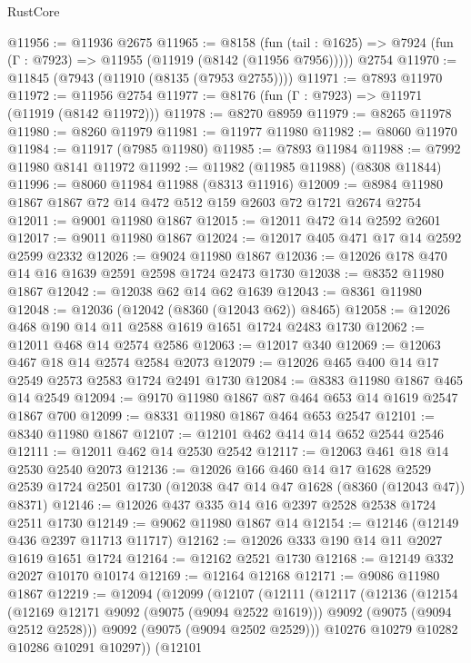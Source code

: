 \begin{lexlean}{RustCore}
\begin{coremodule}
@11956 := @11936 @2675
@11965 := @8158
    (fun (tail : @1625) => @7924 (fun (Γ : @7923) => @11955 (@11919 (@8142 (@11956 @7956)))))
    @2754
@11970 := @11845 (@7943 (@11910 (@8135 (@7953 @2755))))
@11971 := @7893 @11970
@11972 := @11956 @2754
@11977 := @8176 (fun (Γ : @7923) => @11971 (@11919 (@8142 @11972)))
@11978 := @8270 @8959
@11979 := @8265 @11978
@11980 := @8260 @11979
@11981 := @11977 @11980
@11982 := @8060 @11970
@11984 := @11917 (@7985 @11980)
@11985 := @7893 @11984
@11988 := @7992 @11980 @8141 @11972
@11992 := @11982 (@11985 @11988) (@8308 @11844)
@11996 := @8060 @11984 @11988 (@8313 @11916)
@12009 := @8984 @11980 @1867 @1867 @72 @14 @472 @512 @159 @2603 @72 @1721 @2674 @2754
@12011 := @9001 @11980 @1867
@12015 := @12011 @472 @14 @2592 @2601
@12017 := @9011 @11980 @1867
@12024 := @12017 @405 @471 @17 @14 @2592 @2599 @2332
@12026 := @9024 @11980 @1867
@12036 := @12026 @178 @470 @14 @16 @1639 @2591 @2598 @1724 @2473 @1730
@12038 := @8352 @11980 @1867
@12042 := @12038 @62 @14 @62 @1639
@12043 := @8361 @11980
@12048 := @12036 (@12042 (@8360 (@12043 @62)) @8465)
@12058 := @12026 @468 @190 @14 @11 @2588 @1619 @1651 @1724 @2483 @1730
@12062 := @12011 @468 @14 @2574 @2586
@12063 := @12017 @340
@12069 := @12063 @467 @18 @14 @2574 @2584 @2073
@12079 := @12026 @465 @400 @14 @17 @2549 @2573 @2583 @1724 @2491 @1730
@12084 := @8383 @11980 @1867 @465 @14 @2549
@12094 := @9170 @11980 @1867 @87 @464 @653 @14 @1619 @2547 @1867 @700
@12099 := @8331 @11980 @1867 @464 @653 @2547
@12101 := @8340 @11980 @1867
@12107 := @12101 @462 @414 @14 @652 @2544 @2546
@12111 := @12011 @462 @14 @2530 @2542
@12117 := @12063 @461 @18 @14 @2530 @2540 @2073
@12136 := @12026
    @166
    @460
    @14
    @17
    @1628
    @2529
    @2539
    @1724
    @2501
    @1730
    (@12038 @47 @14 @47 @1628 (@8360 (@12043 @47)) @8371)
@12146 := @12026 @437 @335 @14 @16 @2397 @2528 @2538 @1724 @2511 @1730
@12149 := @9062 @11980 @1867 @14
@12154 := @12146 (@12149 @436 @2397 @11713 @11717)
@12162 := @12026 @333 @190 @14 @11 @2027 @1619 @1651 @1724
@12164 := @12162 @2521 @1730
@12168 := @12149 @332 @2027 @10170 @10174
@12169 := @12164 @12168
@12171 := @9086 @11980 @1867
@12219 := @12094
    (@12099
      (@12107
        (@12111
          (@12117
            (@12136
              (@12154
                (@12169 @12171 @9092 (@9075 (@9094 @2522 @1619)))
                @9092
                (@9075 (@9094 @2512 @2528)))
              @9092
              (@9075 (@9094 @2502 @2529)))
            @10276
            @10279
            @10282
            @10286
            @10291
            @10297))
        (@12101

\end{coremodule}
\end{lexlean}
